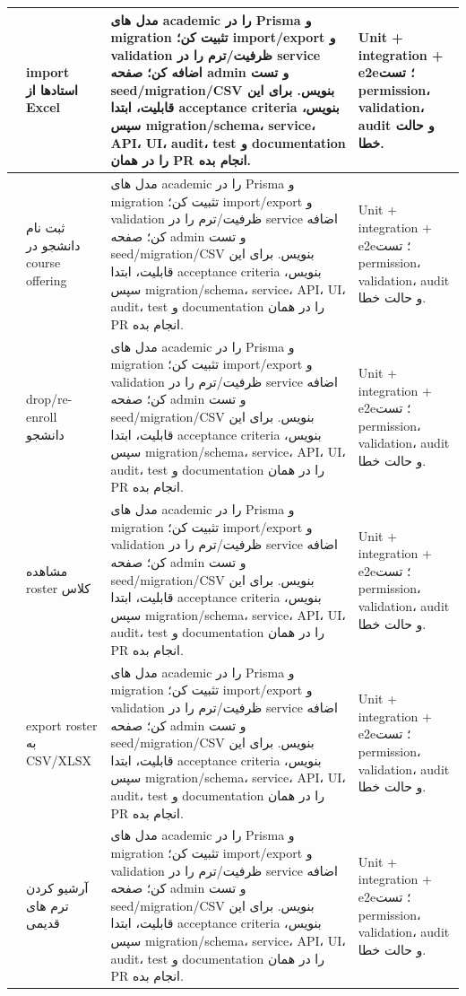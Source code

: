 \documentclass[11pt,a4paper]{article}
\begin{document}
\begin{longtable}{|>{\raggedleft\arraybackslash}p{}|>{\raggedleft\arraybackslash}p{}|>{\raggedleft\arraybackslash}p{}|>{\raggedleft\arraybackslash}p{}|}
30 & import استادها از Excel & مدل های academic را در Prisma و migration تثبیت کن؛ import/export و validation ظرفیت/ترم را در service اضافه کن؛ صفحه admin و تست seed/migration/CSV بنویس. برای این قابلیت، ابتدا acceptance criteria بنویس، سپس migration/schema، service، API، UI، audit، test و documentation را در همان PR انجام بده. & Unit + integration + e2e؛ تست permission، validation، audit و حالت خطا. \\ \hline
31 & ثبت نام دانشجو در course offering & مدل های academic را در Prisma و migration تثبیت کن؛ import/export و validation ظرفیت/ترم را در service اضافه کن؛ صفحه admin و تست seed/migration/CSV بنویس. برای این قابلیت، ابتدا acceptance criteria بنویس، سپس migration/schema، service، API، UI، audit، test و documentation را در همان PR انجام بده. & Unit + integration + e2e؛ تست permission، validation، audit و حالت خطا. \\ \hline
32 & drop/re-enroll دانشجو & مدل های academic را در Prisma و migration تثبیت کن؛ import/export و validation ظرفیت/ترم را در service اضافه کن؛ صفحه admin و تست seed/migration/CSV بنویس. برای این قابلیت، ابتدا acceptance criteria بنویس، سپس migration/schema، service، API، UI، audit، test و documentation را در همان PR انجام بده. & Unit + integration + e2e؛ تست permission، validation، audit و حالت خطا. \\ \hline
33 & مشاهده roster کلاس & مدل های academic را در Prisma و migration تثبیت کن؛ import/export و validation ظرفیت/ترم را در service اضافه کن؛ صفحه admin و تست seed/migration/CSV بنویس. برای این قابلیت، ابتدا acceptance criteria بنویس، سپس migration/schema، service، API، UI، audit، test و documentation را در همان PR انجام بده. & Unit + integration + e2e؛ تست permission، validation، audit و حالت خطا. \\ \hline
34 & export roster به CSV/XLSX & مدل های academic را در Prisma و migration تثبیت کن؛ import/export و validation ظرفیت/ترم را در service اضافه کن؛ صفحه admin و تست seed/migration/CSV بنویس. برای این قابلیت، ابتدا acceptance criteria بنویس، سپس migration/schema، service، API، UI، audit، test و documentation را در همان PR انجام بده. & Unit + integration + e2e؛ تست permission، validation، audit و حالت خطا. \\ \hline
35 & آرشیو کردن ترم های قدیمی & مدل های academic را در Prisma و migration تثبیت کن؛ import/export و validation ظرفیت/ترم را در service اضافه کن؛ صفحه admin و تست seed/migration/CSV بنویس. برای این قابلیت، ابتدا acceptance criteria بنویس، سپس migration/schema، service، API، UI، audit، test و documentation را در همان PR انجام بده. & Unit + integration + e2e؛ تست permission، validation، audit و حالت خطا. \\ \hline
\end{longtable}
\end{document}
